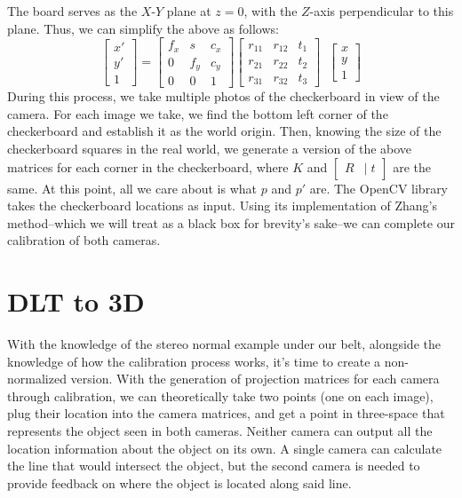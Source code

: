 \documentclass[
    12pt,
    twoside,
    bibstyle=chicago,
    headerstyle=uppercase,
	bibfile=thesis_updating.bib
]{reedthesis}
\newcommand{\rt}{\left[\begin{smallmatrix}R &|\; t\end{smallmatrix}\right]}
\begin{document}

The board serves as the $X$-$Y$ plane at $z=0$, with the $Z$-axis perpendicular to this plane. Thus, we can simplify the above as follows:
\[\begin{bmatrix}x' \\ y' \\ 1\end{bmatrix} = \begin{bmatrix}f_x & s & c_x \\ 0 & f_y & c_y \\ 0 & 0 & 1\end{bmatrix} \begin{bmatrix} r_{11}&r_{12}&t_{1}\\r_{21}&r_{22}&t_{2}\\r_{31}&r_{32}&t_{3}\end{bmatrix}\;\;\begin{bmatrix}x \\ y \\ 1\end{bmatrix} \]
During this process, we take multiple photos of the checkerboard in view of the camera. For each image we take, we find the bottom left corner of the checkerboard and establish it as the world origin. Then, knowing the size of the checkerboard squares in the real world, we generate a version of the above matrices for each corner in the checkerboard, where $K$ and $\rt$ are the same. At this point, all we care about is what $p$ and $p'$ are. The OpenCV library takes the checkerboard locations as input. Using its implementation of Zhang's method--which we will treat as a black box for brevity's sake--we can complete our calibration of both cameras.


\section{DLT to 3D}
With the knowledge of the stereo normal example under our belt, alongside the knowledge of how the calibration process works, it's time to create a non-normalized version. With the generation of projection matrices for each camera through calibration, we can theoretically take two points (one on each image), plug their location into the camera matrices, and get a point in three-space that represents the object seen in both cameras. Neither camera can output all the location information about the object on its own. A single camera can calculate the line that would intersect the object, but the second camera is needed to provide feedback on where the object is located along said line.
\end{document}
